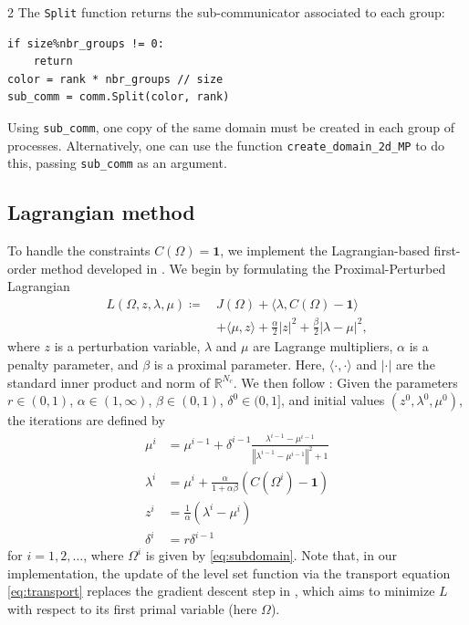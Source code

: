 \documentclass[a4paper, oneside]{article}
\newcommand{\code}[1]{\texttt{#1}}
\begin{document}
\begin{multicols}{2}
The \code{Split} function returns the sub-communicator associated to each group:
\begin{lstlisting}
if size%nbr_groups != 0:
	return
color = rank * nbr_groups // size
sub_comm = comm.Split(color, rank)
\end{lstlisting}
Using \code{sub\_comm}, one copy of the same domain must be created
in each group of processes.
Alternatively, one can use the function \code{create\_domain\_2d\_MP} to do this,
passing \code{sub\_comm} as an argument.

\subsection{Lagrangian method}\label{sub:lagrangian}

To handle the constraints $C(\Omega)=\boldsymbol{1}$,
we implement the Lagrangian-based first-order method developed in \cite{MR4589221}.
We begin by formulating the Proximal-Perturbed Lagrangian
\begin{equation} \label{eq:lagrangian}
\begin{aligned}
L(\Omega, z, \lambda, \mu) \coloneqq\,
& J(\Omega) + \langle \lambda, C(\Omega) -  \boldsymbol{1} \rangle \\
&+ \langle \mu, z \rangle + \frac{\alpha}{2} \vert z \vert^2 + \frac{\beta}{2} \vert \lambda - \mu \vert^2,
\end{aligned}
\end{equation}
where $z$ is a perturbation variable,
$\lambda$ and $\mu$ are Lagrange multipliers,
$\alpha$ is a penalty parameter, and
$\beta$ is a proximal parameter.
Here, $\langle \cdot, \cdot \rangle$ and $\vert \cdot \vert$
are the standard inner product and norm of $\mathds{R}^{N_c}$.
We then follow \cite[Algorithm~1]{MR4589221}:
Given the parameters 
$r\in(0,1)$,
$\alpha\in(1,\infty)$, $\beta\in(0,1)$, 
$\delta^{0}\in(0,1]$, and initial values
$(z^{0},\lambda^{0},\mu^{0})$,
the iterations are defined by
\begin{equation} \label{eq:lag_method}
\begin{aligned}
\mu^{i} & = \mu^{i-1}+\delta^{i-1}\tfrac{\lambda^{i-1}-\mu^{i-1}}{\left\Vert \lambda^{i-1}-\mu^{i-1} \right\Vert^{2} + 1}\\
\lambda^{i} & = \mu^{i} + \tfrac{\alpha}{1+\alpha \beta} (C(\Omega^{i})- \boldsymbol{1})\\
z^{i} & = \tfrac{1}{\alpha}(\lambda^{i}-\mu^{i})\\
\delta^{i} & =r\delta^{i-1}
\end{aligned}
\end{equation}
for $i=1,2,\dots$, where $\Omega^{i}$ is given by \eqref{eq:subdomain}.
Note that, in our implementation,
the update of the level set function via the transport equation \eqref{eq:transport}
replaces the gradient descent step in \cite[Algorithm~1]{MR4589221},
which aims to minimize $L$ with respect to its first primal variable (here $\Omega$).


\end{multicols}
\end{document}

